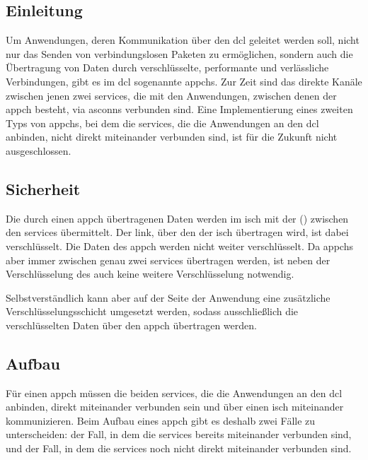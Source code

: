 \label{dcl-appch}
\subsection{Einleitung}
Um Anwendungen, deren Kommunikation über den \gls{dcl} geleitet werden soll,
nicht nur das Senden von verbindungslosen Paketen zu ermöglichen, sondern auch
die Übertragung von Daten durch verschlüsselte, performante und verlässliche
Verbindungen, gibt es im \gls{dcl} sogenannte \glspl{appch}.
Zur Zeit sind das direkte Kanäle zwischen jenen zwei \glspl{service}, die mit
den Anwendungen, zwischen denen der \gls{appch} besteht, via \glspl{asconn}
verbunden sind.
Eine Implementierung eines zweiten Typs von \glspl{appch}, bei dem die
\glspl{service}, die die Anwendungen an den \gls{dcl} anbinden, nicht direkt
miteinander verbunden sind, ist für die Zukunft nicht ausgeschlossen.

\subsection{Sicherheit}
Die durch einen \gls{appch} übertragenen Daten werden im \gls{isch} mit der
\msg{\isprotoacd} () zwischen den \glspl{service}
übermittelt.
Der \gls{link}, über den der \gls{isch} übertragen wird, ist dabei
verschlüsselt.
Die Daten des \gls{appch} werden nicht weiter verschlüsselt.
Da \glspl{appch} aber immer zwischen genau zwei \glspl{service} übertragen
werden, ist neben der Verschlüsselung des  auch keine
weitere Verschlüsselung notwendig.

Selbstverständlich kann aber auf der Seite der Anwendung eine zusätzliche
Verschlüsselungsschicht umgesetzt werden, sodass ausschließlich die
verschlüsselten Daten über den \gls{appch} übertragen werden.

\subsection{Aufbau}
Für einen \gls{appch} müssen die beiden \glspl{service}, die die Anwendungen an
den \gls{dcl} anbinden, direkt miteinander verbunden sein und über einen
\gls{isch} miteinander kommunizieren.
Beim Aufbau eines \gls{appch} gibt es deshalb zwei Fälle zu unterscheiden:
der Fall, in dem die \glspl{service} bereits miteinander verbunden sind, und der
Fall, in dem die \glspl{service} noch nicht direkt miteinander verbunden sind.

